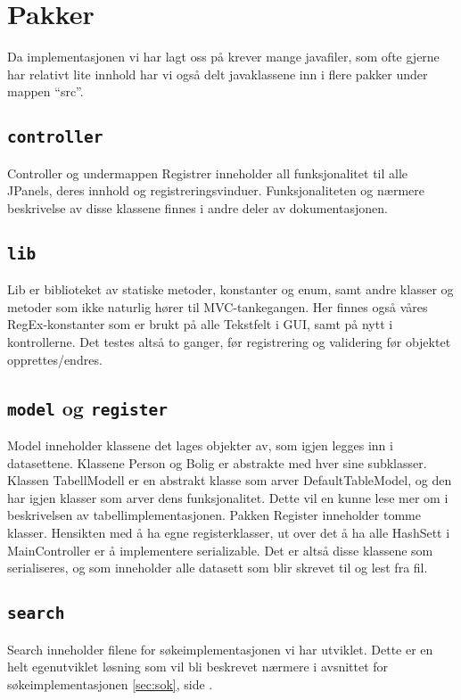 \section{Pakker} \label{sec:klasserogpakker}
Da implementasjonen vi har lagt oss på krever mange javafiler, som ofte gjerne har relativt lite innhold har vi også delt javaklassene inn i flere pakker under mappen “src”.

\subsection*{\texttt{controller}}
Controller og undermappen Registrer inneholder all funksjonalitet til alle JPanels, deres innhold og registreringsvinduer. Funksjonaliteten og nærmere beskrivelse av disse klassene finnes i andre deler av dokumentasjonen.

\subsection*{\texttt{lib}}
Lib er biblioteket av statiske metoder, konstanter og enum, samt andre klasser og metoder som ikke naturlig hører til MVC-tankegangen.
Her finnes også våres RegEx-konstanter som er brukt på alle Tekstfelt i GUI, samt på nytt i kontrollerne. Det testes altså to ganger, før registrering og validering før objektet opprettes/endres.

\subsection*{\texttt{model} og \texttt{register}}
Model inneholder klassene det lages objekter av, som igjen legges inn i datasettene. Klassene Person og Bolig er abstrakte med hver sine subklasser. Klassen TabellModell er en abstrakt klasse som arver DefaultTableModel, og den har igjen klasser som arver dens funksjonalitet. Dette vil en kunne lese mer om i beskrivelsen av tabellimplementasjonen.
Pakken Register inneholder tomme klasser. Hensikten med å ha egne registerklasser, ut over det å ha alle HashSett i MainController er å implementere serializable. Det er altså disse klassene som serialiseres, og som inneholder alle datasett som blir skrevet til og lest fra fil.

\subsection*{\texttt{search}}
Search inneholder filene for søkeimplementasjonen vi har utviklet. Dette er en helt egenutviklet løsning som vil bli beskrevet nærmere i avsnittet for søkeimplementasjonen \ref{sec:sok}, side \pageref{sec:sok}.

